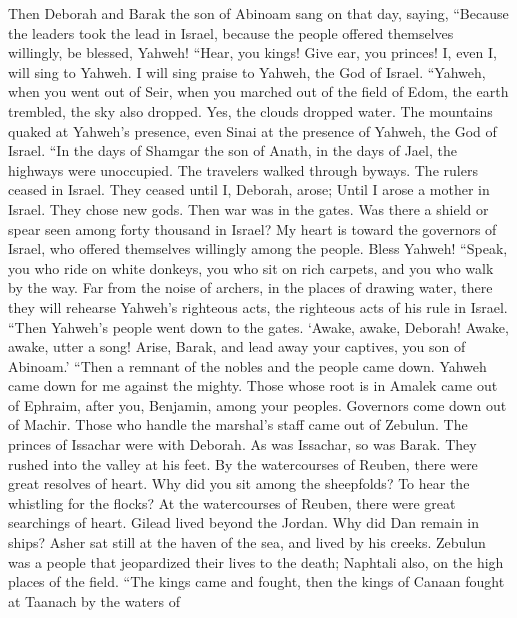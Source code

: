  Then Deborah and Barak the son of Abinoam sang on that
day, saying,  ``Because the leaders took the lead in
Israel, because the people offered themselves willingly, be blessed,
Yahweh!  ``Hear, you kings! Give ear, you princes! I, even
I, will sing to Yahweh. I will sing praise to Yahweh, the God of Israel.
 ``Yahweh, when you went out of Seir, when you marched out
of the field of Edom, the earth trembled, the sky also dropped. Yes, the
clouds dropped water.  The mountains quaked at Yahweh's
presence, even Sinai at the presence of Yahweh, the God of Israel.
 ``In the days of Shamgar the son of Anath, in the days of
Jael, the highways were unoccupied. The travelers walked through byways.
 The rulers ceased in Israel. They ceased until I,
Deborah, arose; Until I arose a mother in Israel.  They
chose new gods. Then war was in the gates. Was there a shield or spear
seen among forty thousand in Israel?  My heart is toward
the governors of Israel, who offered themselves willingly among the
people. Bless Yahweh!  ``Speak, you who ride on white
donkeys, you who sit on rich carpets, and you who walk by the way.
 Far from the noise of archers, in the places of drawing
water, there they will rehearse Yahweh's righteous acts, the righteous
acts of his rule in Israel. ``Then Yahweh's people went down to the
gates.  `Awake, awake, Deborah! Awake, awake, utter a
song! Arise, Barak, and lead away your captives, you son of Abinoam.'
 ``Then a remnant of the nobles and the people came down.
Yahweh came down for me against the mighty.  Those whose
root is in Amalek came out of Ephraim, after you, Benjamin, among your
peoples. Governors come down out of Machir. Those who handle the
marshal's staff came out of Zebulun.  The princes of
Issachar were with Deborah. As was Issachar, so was Barak. They rushed
into the valley at his feet. By the watercourses of Reuben, there were
great resolves of heart.  Why did you sit among the
sheepfolds? To hear the whistling for the flocks? At the watercourses of
Reuben, there were great searchings of heart.  Gilead
lived beyond the Jordan. Why did Dan remain in ships? Asher sat still at
the haven of the sea, and lived by his creeks.  Zebulun
was a people that jeopardized their lives to the death; Naphtali also,
on the high places of the field.  ``The kings came and
fought, then the kings of Canaan fought at Taanach by the waters of
